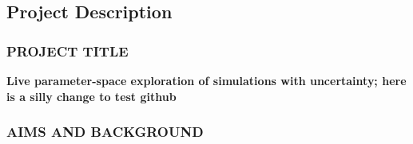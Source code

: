 \documentclass[a4paper,fontsize=12pt]{scrartcl}
\author{}
\date{\today}
\begin{document}
\renewcommand{\thesection}{\Alph{section}}

\setcounter{section}{3} %
\subsection{Project Description}
\label{sec:project-description}

\subsubsection*{PROJECT TITLE}

\textbf{Live parameter-space exploration of simulations with uncertainty; here is a silly change to test github} 





\subsubsection*{AIMS AND BACKGROUND}
\end{document}

